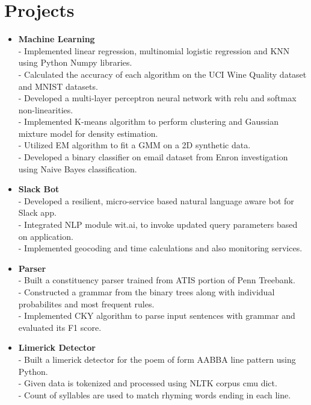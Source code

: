 \section {Projects}
\begin{itemize}


 \item \textbf{Machine Learning} \\
 - Implemented linear regression, multinomial logistic regression and KNN using Python Numpy libraries. \\
 - Calculated the accuracy of each algorithm on the UCI Wine Quality dataset and MNIST datasets.\\
 - Developed a multi-layer perceptron neural network with relu and softmax non-linearities. \\
 - Implemented K-means algorithm to perform clustering and Gaussian mixture model for density estimation.\\
 - Utilized EM algorithm to fit a GMM on a 2D synthetic data.\\
 - Developed a binary classifier on email dataset from Enron investigation using Naive Bayes classification.

 \item \textbf{Slack Bot} \\
 - Developed a resilient, micro-service based natural language aware bot for Slack app.\\
 - Integrated NLP module wit.ai, to invoke updated query parameters based on application.\\
 - Implemented geocoding and time calculations and also monitoring services. 

  \item \textbf{Parser} \\
 - Built a constituency parser trained from ATIS portion of Penn Treebank.\\
 - Constructed a grammar from the binary trees along with individual probabilites and most frequent rules. \\
 - Implemented CKY algorithm to parse input sentences with grammar and evaluated its F1 score.

  \item \textbf{Limerick Detector} \\
 - Built a limerick detector for the poem of form AABBA line pattern using Python.\\
 - Given data is tokenized and processed using NLTK corpus cmu dict.\\
 - Count of syllables are used to match rhyming words ending in each line.


\end{itemize}
